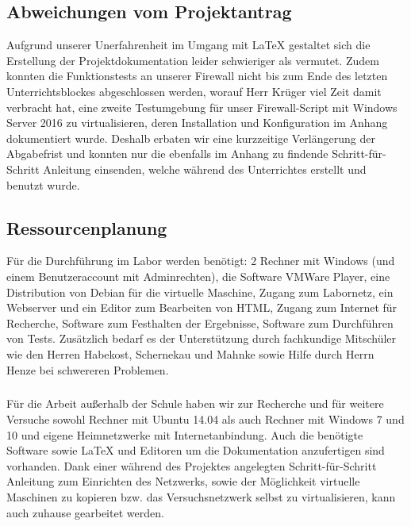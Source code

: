 \subsection{Abweichungen vom Projektantrag}
\label{sec:AbweichungenProjektantrag}

    Aufgrund unserer Unerfahrenheit im Umgang mit \LaTeX{} gestaltet sich die Erstellung der Projektdokumentation leider schwieriger als vermutet. Zudem konnten die Funktionstests an unserer Firewall nicht bis zum Ende des letzten Unterrichtsblockes abgeschlossen werden, worauf Herr Krüger viel Zeit damit verbracht hat, eine zweite Testumgebung für unser Firewall-Script mit Windows Server 2016 zu virtualisieren, deren Installation und Konfiguration im Anhang dokumentiert wurde. Deshalb erbaten wir  eine kurzzeitige Verlängerung der Abgabefrist und konnten nur die ebenfalls im Anhang zu findende Schritt-für-Schritt Anleitung einsenden, welche während des Unterrichtes erstellt und benutzt wurde.

\subsection{Ressourcenplanung}
\label{sec:Ressourcenplanung}

Für die Durchführung im Labor werden benötigt: 2 Rechner mit Windows (und einem Benutzeraccount mit Adminrechten), die Software VMWare Player, eine Distribution von Debian für die virtuelle Maschine, Zugang zum Labornetz, ein Webserver und ein Editor zum Bearbeiten von HTML, Zugang zum Internet für Recherche, Software zum Festhalten der Ergebnisse, Software zum Durchführen von Tests. Zusätzlich bedarf es der Unterstützung durch fachkundige Mitschüler wie den Herren Habekost, Schernekau und Mahnke sowie Hilfe durch Herrn Henze bei schwereren Problemen.
\subparagraph{} Für die Arbeit außerhalb der Schule haben wir zur Recherche und für weitere Versuche sowohl Rechner mit Ubuntu 14.04 als auch Rechner mit Windows 7 und 10 und eigene Heimnetzwerke mit Internetanbindung. Auch die benötigte Software sowie \LaTeX{} und Editoren um die Dokumentation anzufertigen sind vorhanden. Dank einer während des Projektes angelegten Schritt-für-Schritt Anleitung zum Einrichten des Netzwerks, sowie der Möglichkeit virtuelle Maschinen zu kopieren bzw. das Versuchsnetzwerk selbst zu virtualisieren, kann auch zuhause gearbeitet werden.

